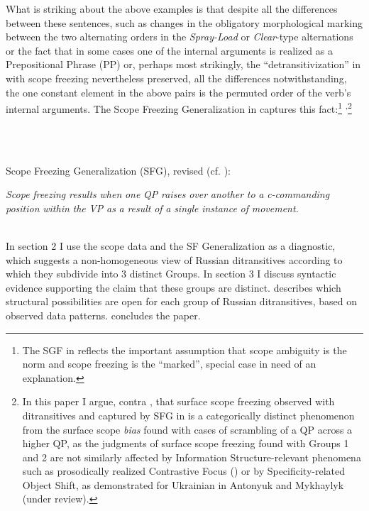\documentclass[output=paper,modfonts, nonflat]{langsci/langscibook}
\begin{document}
What is striking about the above examples is that despite all the differences between these sentences, such as changes in the obligatory morphological marking between the two alternating orders in the \textit{Spray-Load} or \textit{Clear}{}-type alternations or the fact that in some cases one of the internal arguments is realized as a Prepositional Phrase (PP) or, perhaps most strikingly, the “detransitivization” in  with scope freezing nevertheless preserved, all the differences notwithstanding, the one constant element in the above pairs is the permuted order of the verb’s internal arguments. The Scope Freezing Generalization in  captures this fact:\footnote{The SGF in  reflects the important assumption that scope ambiguity is the norm and scope freezing is the “marked”, special case in need of an explanation.} \textsuperscript{,}\footnote{In this paper I argue, contra \citet{Antonyuk2015}, that surface scope freezing observed with ditransitives and captured by SFG in  is a categorically distinct phenomenon from the surface scope \textit{bias} found with cases of scrambling of a QP across a higher QP, as the judgments of surface scope freezing found with Groups 1 and 2 are not similarly affected by Information Structure-relevant phenomena such as prosodically realized Contrastive Focus (\citealt{AntonyukLarson2016}) or by Specificity-related Object Shift, as demonstrated for Ukrainian in Antonyuk and Mykhaylyk (under review).}

\ea%
    \label{ex:key:8}
    \gll\\
        \\
    \glt
    \z

         Scope Freezing Generalization (SFG), revised (cf. \citealt{Antonyuk2015}): 

\textit{Scope} \textit{freezing} \textit{results} \textit{when} \textit{one} \textit{QP} \textit{raises} \textit{over} \textit{another} \textit{to} \textit{a} \textit{c-commanding} \textit{position} \textit{within} \textit{the} \textit{VP} \textit{as} \textit{a} \textit{result} \textit{of} \textit{a} \textit{single} \textit{instance} \textit{of} \textit{movement.}

\\
In section 2 I use the scope data and the SF Generalization as a diagnostic, which suggests a non-homogeneous view of Russian ditransitives according to which they subdivide into 3 distinct Groups. In section 3 I discuss syntactic evidence supporting the claim that these groups are distinct.  describes which structural possibilities are open for each group of Russian ditransitives, based on observed data patterns.  concludes the paper. 
\end{document}
